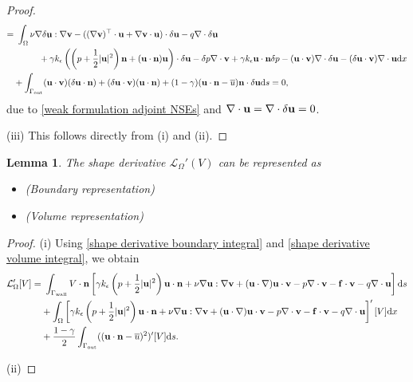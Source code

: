 \documentclass[oneside,11pt]{book}
\numberwithin{equation}{section}
\newtheorem{lemma}{Lemma}[section]
\begin{document}
\begin{proof}
\begin{align}
        =&\ \int_\Omega \nu\nabla\delta{\bf u}:\nabla{\bf v} - ((\nabla{\bf v})^\top\cdot{\bf u} + \nabla{\bf v}\cdot{\bf u})\cdot\delta{\bf u} - q\nabla\cdot\delta{\bf u} \\
        &\hspace{1cm}+ \gamma k_\epsilon\left(\left(p + \frac{1}{2}|{\bf u}|^2\right){\bf n} + ({\bf u}\cdot{\bf n}){\bf u}\right)\cdot\delta{\bf u} - \delta p\nabla\cdot{\bf v} + \gamma k_\epsilon{\bf u}\cdot{\bf n}\delta p - ({\bf u}\cdot{\bf v})\nabla\cdot\delta{\bf u} - (\delta{\bf u}\cdot{\bf v})\nabla\cdot{\bf u}{\rm d}x\\
        &+ \int_{\Gamma_{\rm out}} ({\bf u}\cdot{\bf v})(\delta{\bf u}\cdot{\bf n}) + (\delta{\bf u}\cdot{\bf v})({\bf u}\cdot{\bf n}) + (1 - \gamma)({\bf u}\cdot{\bf n} - \overline{u}){\bf n}\cdot\delta{\bf u}{\rm d}s = 0,
    \end{align}
    due to \eqref{weak formulation adjoint NSEs} and $\nabla\cdot{\bf u} = \nabla\cdot\delta{\bf u} = 0$.
    
    (iii) This follows directly from (i) and (ii).
\end{proof}

\begin{lemma}
    The shape derivative $\mathcal{L}_{\Omega}'(V)$ can be represented as
    \begin{itemize}
        \item[(i)] (Boundary representation)
        \item[(ii)] (Volume representation)
    \end{itemize}
\end{lemma}

\begin{proof}
    (i) Using \eqref{shape derivative boundary integral} and \eqref{shape derivative volume integral}, we obtain
    \begin{align}
        \mathcal{L}_{\Omega}'[V] =&\ \int_{\Gamma_{\rm wall}} V\cdot{\bf n}\left[\gamma k_\epsilon\left(p + \frac{1}{2}|{\bf u}|^2\right){\bf u}\cdot{\bf n} + \nu\nabla{\bf u}:\nabla{\bf v} + ({\bf u}\cdot\nabla){\bf u}\cdot{\bf v} - p\nabla\cdot{\bf v} - {\bf f}\cdot{\bf v} - q\nabla\cdot{\bf u}\right]{\rm d}s\\
        &+ \int_\Omega \left[\gamma k_\epsilon\left(p + \frac{1}{2}|{\bf u}|^2\right){\bf u}\cdot{\bf n} + \nu\nabla{\bf u}:\nabla{\bf v} + ({\bf u}\cdot\nabla){\bf u}\cdot{\bf v} - p\nabla\cdot{\bf v} - {\bf f}\cdot{\bf v} - q\nabla\cdot{\bf u}\right]'[V]{\rm d}x\\
        &+ \frac{1 - \gamma}{2}\int_{\Gamma_{\rm out}} (({\bf u}\cdot{\bf n} - \overline{u})^2)'[V]{\rm d}s.
    \end{align}
    
    (ii) 
\end{proof}
\end{document}
